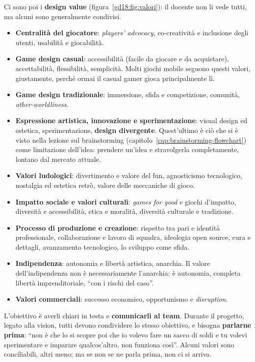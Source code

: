 Ci sono poi i \textbf{design value} (figura~\ref{gd18:fig:valori}): il docente non li
vede tutti, ma alcuni sono generalmente condivisi.
\begin{itemize}
  \item \textbf{Centralità del giocatore}: \emph{players' advocacy}, co-creatività e
        inclusione degli utenti, usabilità e giocabilità.
  \item \textbf{Game design casual}: accessibilità (facile da giocare e da
        acquistare), accettabilità, flessibilità, semplicità. Molti giochi mobile
        seguono questi valori, giustamente, perché ormai il casual gamer gioca
        principalmente lì.
  \item \textbf{Game design tradizionale}: immersione, sfida e competizione,
        comunità, \emph{other-worldliness}.
  \item \textbf{Espressione artistica, innovazione e sperimentazione}: visual design
        ed estetica, sperimentazione, \textbf{design divergente}. Quest'ultimo è ciò
        che si è visto nella lezione sul brainstorming
        (capitolo~\ref{cap:brainstorming-flowchart}) come limitazione dell'idea:
        prendere un'idea e stravolgerla completamente, lontano dal mercato attuale.
  \item \textbf{Valori ludologici}: divertimento e valore del fun, agnosticismo
        tecnologico, nostalgia ed estetica retrò, valore delle meccaniche di gioco.
  \item \textbf{Impatto sociale e valori culturali}: \emph{games for good} e giochi
        d'impatto, diversità e accessibilità, etica e moralità, diversità culturale e
        tradizione.
  \item \textbf{Processo di produzione e creazione}: rispetto tra pari e identità
        professionale, collaborazione e lavoro di squadra, ideologia open source, cura
        e dettagli, avanzamento tecnologico, lo sviluppo come sfida.
  \item \textbf{Indipendenza}: autonomia e libertà artistica, anarchia. Il valore
        dell'indipendenza non è necessariamente l'anarchia: è autonomia, completa
        libertà imprenditoriale, ``con i rischi del caso''.
  \item \textbf{Valori commerciali}: successo economico, opportunismo e
        \emph{disruption}.
\end{itemize}
L'obiettivo è averli chiari in testa e \textbf{comunicarli al team}. Durante il
progetto, legato alla vision, tutti devono condividere lo stesso obiettivo, e bisogna
\textbf{parlarne prima}: ``non è che lo si scopre poi che io volevo fare un sacco di
soldi e tu volevi sperimentare e imparare qualcos'altro, non funziona così''. Alcuni
valori sono conciliabili, altri meno; ma se non se ne parla prima, non ci si arriva.

